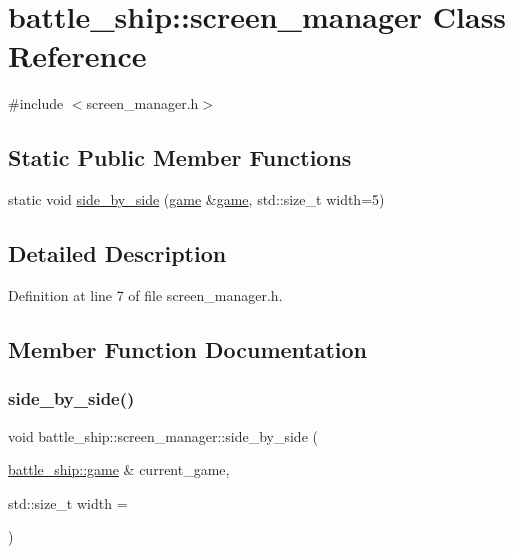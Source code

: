 \hypertarget{classbattle__ship_1_1screen__manager}{}\section{battle\+\_\+ship\+:\+:screen\+\_\+manager Class Reference}
\label{classbattle__ship_1_1screen__manager}


{\ttfamily \#include $<$screen\+\_\+manager.\+h$>$}

\subsection*{Static Public Member Functions}
\begin{DoxyCompactItemize}
\item 
static void \hyperlink{classbattle__ship_1_1screen__manager_a3072fc30bb259bfc76ed11b8a8f6988c}{side\+\_\+by\+\_\+side} (\hyperlink{classbattle__ship_1_1game}{game} \&\hyperlink{classbattle__ship_1_1game}{game}, std\+::size\+\_\+t width=5)
\end{DoxyCompactItemize}


\subsection{Detailed Description}


Definition at line 7 of file screen\+\_\+manager.\+h.



\subsection{Member Function Documentation}
\mbox{\label{classbattle__ship_1_1screen__manager_a3072fc30bb259bfc76ed11b8a8f6988c}} 
\subsubsection{\texorpdfstring{side\+\_\+by\+\_\+side()}{side\_by\_side()}}
{\footnotesize\ttfamily void battle\+\_\+ship\+::screen\+\_\+manager\+::side\+\_\+by\+\_\+side (\begin{DoxyParamCaption}\item[{\hyperlink{classbattle__ship_1_1game}{battle\+\_\+ship\+::game} \&}]{current\+\_\+game,  }\item[{std\+::size\+\_\+t}]{width = {} }\end{DoxyParamCaption})\hspace{0.3cm}{\ttfamily [static]}}




